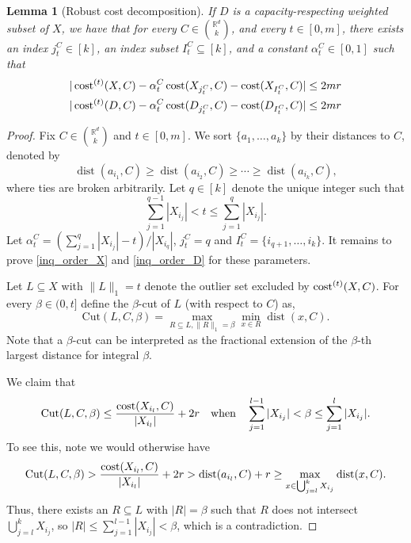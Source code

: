 \documentclass[11pt,letterpaper]{article}
\newtheorem{lemma}[theorem]{Lemma}
\theoremstyle{definition}
\DeclareMathOperator{\dist}{dist}
\begin{document}
\begin{lemma}[Robust cost decomposition]
\label{proof_Euc_order} 
If $D$ is a capacity-respecting weighted subset of $X$, we have that
	for every $C\in \binom{\mathbb{R}^d}{k}$, and every $t\in [0,m]$, there exists an index $j_t^C\in [k]$, an index subset $I_t^C\subseteq [k]$, and a constant $\alpha_t^C\in [0,1]$ such that
	\begin{gather} 
		|\cost^{(t)}(X,C)- \alpha_t^C\cost(X_{j_t^C},C)-\cost(X_{I_t^C},C)|\leq 2mr \label{inq_order_X} \\
		|\cost^{(t)}(D,C)- \alpha_t^C\cost(D_{j_t^C},C)-\cost(D_{I_t^C},C)|\leq 2mr \label{inq_order_D}
	\end{gather}
\end{lemma}
\begin{proof}
	Fix $C\in \binom{\mathbb{R}^d}{k}$ and $t\in [0,m]$. We sort $\{a_1,\dots,a_k\}$ by their distances to $C$, denoted by
	$$
	\dist(a_{i_1},C)\geq \dist(a_{i_2},C)\geq\cdots\geq \dist(a_{i_k},C),
	$$ where ties are broken arbitrarily. Let $q\in [k]$ denote the unique integer such that $$\sum_{j=1}^{q-1} |X_{i_j}|<t\leq \sum_{j=1}^q |X_{i_j}|.$$ 
	Let $\alpha_t^C = (\sum_{j=1}^q |X_{i_j}|-t)/|X_{i_q}|$, $j_t^C=q$ and $I_t^C=\{i_{q+1},\dots,i_k\}$. It remains to prove \eqref{inq_order_X} and \eqref{inq_order_D} for these parameters.
	
	Let $L\subseteq X$ with $\|L\|_1=t$ denote the outlier set excluded by $\cost^{(t)}(X,C)$. For every $\beta\in (0,t]$ define the $\beta$-cut of $L$ (with respect to $C$) as, 
	$$
	\mathrm{Cut}(L,C,\beta)=\max_{R\subseteq L,\|R\|_1=\beta} \min_{x\in R} \dist(x,C).
	$$ 
	Note that a $\beta$-cut can be interpreted as the fractional extension of the $\beta$-th largest distance for integral $\beta$.
	
	We claim that
	\[
	\mathrm{Cut}(L,C,\beta)\leq \frac{\cost(X_{i_l},C)}{|X_{i_l}|}+2r \quad\text{when}\quad \sum_{j=1}^{l-1}|X_{i_j}|<\beta\leq \sum_{j=1}^{l}|X_{i_j}|.
	\]
	To see this, note we would otherwise have 
	\[
	\mathrm{Cut}(L,C,\beta)> \frac{\cost(X_{i_l},C)}{|X_{i_l}|}+2r>\dist(a_{i_l},C)+r\geq \max_{x\in \bigcup_{j=l}^k X_{i_j}} \dist(x,C).
	\]
	Thus, there exists an $R\subseteq L$ with $|R|=\beta$ such that $R$ does not intersect $\bigcup_{j=l}^k X_{i_j}$, so $|R|\leq \sum_{j=1}^{l-1} |X_{i_j}|<\beta$, which is a contradiction.
	

\end{proof}
\end{document}
